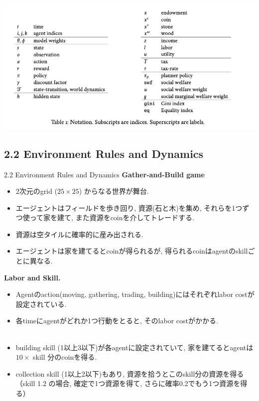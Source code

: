\documentclass[unicode,aspectratio=169,11pt]{beamer}
\begin{document}
\begin{frame}
    \begin{center}
        \includegraphics[width=15cm]{table1.png}
    \end{center}
\end{frame}

\subsection{2.2 Environment Rules and Dynamics}
\begin{frame}{2.2 Environment Rules and Dynamics}{}
{\bf Gather-and-Build game}
\begin{itemize}
    \item 2次元のgrid ($25 \times 25$) からなる世界が舞台.
    \item エージェントはフィールドを歩き回り, 資源(石と木)を集め, それらを1つずつ使って家を建て, また資源をcoinを介してトレードする.
    \item 資源は空タイルに確率的に産み出される.
    \item エージェントは家を建てるとcoinが得られるが, 得られるcoinはagentのskillごとに異なる.
\end{itemize}
\end{frame}

\begin{frame}{}{}
{\bf Labor and Skill.}
\begin{itemize}
    \item Agentのaction(moving, gathering, trading, building)にはそれぞれlabor costが設定されている.
    \item 各timeにagentがどれか1つ行動をとると, そのlabor costがかかる.\\
    　
    \item building skill (1以上3以下)が各agentに設定されていて, 家を建てるとagentは $10 \times$ skill 分のcoinを得る.
    \item collection skill (1以上2以下)もあり, 資源を拾うとこのskill分の資源を得る\\
          （skill 1.2 の場合, 確定で1つ資源を得て, さらに確率0.2でもう1つ資源を得る）
\end{itemize}
\end{frame}
\end{document}

